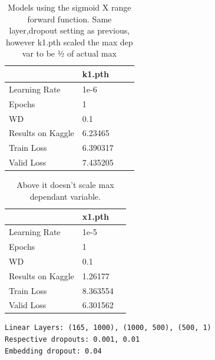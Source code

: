 \documentclass[10pt,twocolumn,letterpaper]{article}
\begin{document}
\begin{table}[]
  \begin{center}
    \tabcolsep=0.11cm
    \begin{tabular}{|l|l|l|l|}
    \hline
                      & k1.pth   \\ \hline
    Learning Rate     & 1e-6     \\ \hline
    Epochs            & 1        \\ \hline
    WD                & 0.1      \\ \hline
    Results on Kaggle & 6.23465  \\ \hline
    Train Loss        & 6.390317 \\ \hline
    Valid Loss        & 7.435205 \\ \hline
    \end{tabular}
  \end{center}
  \caption{Models using the sigmoid X range forward function. Same layer,dropout
  setting as previous, however k1.pth scaled the max dep var to be ½ of actual
  max}
\end{table}

\begin{table}[]
  \begin{center}
    \tabcolsep=0.11cm
    \begin{tabular}{|l|l|l|}
    \hline
                      & x1.pth    \\ \hline
    Learning Rate     & 1e-5      \\ \hline
    Epochs            & 1         \\ \hline
    WD                & 0.1       \\ \hline
    Results on Kaggle & 1.26177   \\ \hline
    Train Loss        & 8.363554  \\ \hline
    Valid Loss        & 6.301562  \\ \hline
    \end{tabular}
    {\scriptsize
    \begin{verbatim}
Linear Layers: (165, 1000), (1000, 500), (500, 1)
Respective dropouts: 0.001, 0.01
Embedding dropout: 0.04
    \end{verbatim}}
  \end{center}
  \caption{Above it doesn’t scale max dependant variable.}
\end{table}
\end{document}
